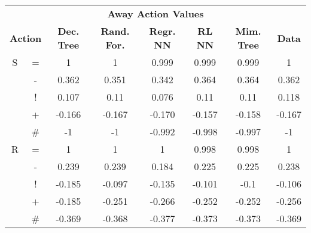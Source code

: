 \documentclass{sfuthesis}
\begin{document}
	\begin{table}
		\centering
		\begin{tabular}{cccccccc}
			\multicolumn{8}{c}{\textbf{Away Action Values}}                                                                                                                                \\
			\multicolumn{2}{c|}{\textbf{Action}} & \textbf{Dec. Tree} & \textbf{Rand. For.} & \textbf{Regr. NN} & \textbf{RL NN} & \multicolumn{1}{c|}{\textbf{Mim. Tree}} & \textbf{Data} \\ \hline
			S      & \multicolumn{1}{c|}{=}      & 1                  & 1                   & 0.999             & 0.999          & \multicolumn{1}{c|}{0.999}              & 1             \\
			& \multicolumn{1}{c|}{-}      & 0.362              & 0.351               & 0.342             & 0.364          & \multicolumn{1}{c|}{0.364}              & 0.362         \\
			& \multicolumn{1}{c|}{!}      & 0.107              & 0.11                & 0.076             & 0.11           & \multicolumn{1}{c|}{0.11}               & 0.118         \\
			& \multicolumn{1}{c|}{+}      & -0.166             & -0.167              & -0.170            & -0.157         & \multicolumn{1}{c|}{-0.158}             & -0.167        \\
			& \multicolumn{1}{c|}{\#}     & -1                 & -1                  & -0.992            & -0.998         & \multicolumn{1}{c|}{-0.997}             & -1            \\ \hline
			R      & \multicolumn{1}{c|}{=}      & 1                  & 1                   & 1                 & 0.998          & \multicolumn{1}{c|}{0.998}              & 1             \\
			& \multicolumn{1}{c|}{-}      & 0.239              & 0.239               & 0.184             & 0.225          & \multicolumn{1}{c|}{0.225}              & 0.238         \\
			& \multicolumn{1}{c|}{!}      & -0.185             & -0.097              & -0.135            & -0.101         & \multicolumn{1}{c|}{-0.1}               & -0.106        \\
			& \multicolumn{1}{c|}{+}      & -0.185             & -0.251              & -0.266            & -0.252         & \multicolumn{1}{c|}{-0.252}             & -0.256        \\
			& \multicolumn{1}{c|}{\#}     & -0.369             & -0.368              & -0.377            & -0.373         & \multicolumn{1}{c|}{-0.373}             & -0.369        \\ \hline

\end{tabular}
\end{table}
\end{document}
